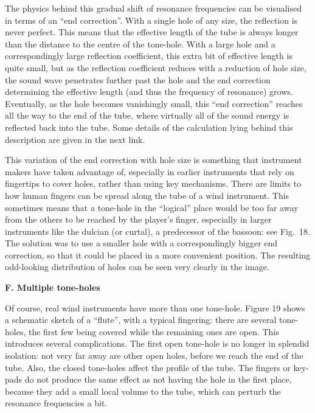   The physics behind this gradual shift of resonance frequencies can be 
  visualised in terms of an ``end correction''. With a single hole of any size, 
  the reflection is never perfect. This means that the effective length of the 
  tube is always longer than the distance to the centre of the tone-hole. With 
  a large hole and a correspondingly large reflection coefficient, this extra 
  bit of effective length is quite small, but as the reflection coefficient 
  reduces with a reduction of hole size, the sound wave penetrates further past 
  the hole and the end correction determining the effective length (and thus 
  the frequency of resonance) grows. Eventually, as the hole becomes 
  vanishingly small, this ``end correction'' reaches all the way to the end of 
  the tube, where virtually all of the sound energy is reflected back into the 
  tube. Some details of the calculation lying behind this description are given 
  in the next link. 

  This variation of the end correction with hole size is something that 
  instrument makers have taken advantage of, especially in earlier instruments 
  that rely on fingertips to cover holes, rather than using key mechanisms. 
  There are limits to how human fingers can be spread along the tube of a wind 
  instrument. This sometimes means that a tone-hole in the ``logical'' place 
  would be too far away from the others to be reached by the player's finger, 
  especially in larger instruments like the dulcian (or curtal), a predecessor 
  of the bassoon: see Fig.\ 18. The solution was to use a smaller hole with a 
  correspondingly bigger end correction, so that it could be placed in a more 
  convenient position. The resulting odd-looking distribution of holes can be 
  seen very clearly in the image. 


  \textbf{F. Multiple tone-holes} 

  Of course, real wind instruments have more than one tone-hole. Figure 19 
  shows a schematic sketch of a “flute”, with a typical fingering: there are 
  several tone-holes, the first few being covered while the remaining ones are 
  open. This introduces several complications. The first open tone-hole is no 
  longer in splendid isolation: not very far away are other open holes, before 
  we reach the end of the tube. Also, the closed tone-holes affect the profile 
  of the tube. The fingers or key-pads do not produce the same effect as not 
  having the hole in the first place, because they add a small local volume to 
  the tube, which can perturb the resonance frequencies a bit. 

